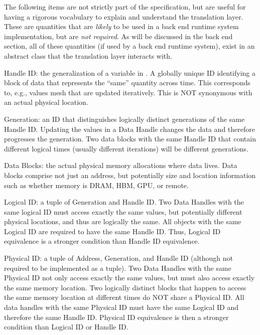The following items are not strictly part of the specification, but are useful
for having a rigorous vocabulary to explain and understand the \gls{translation
layer}.  These are quantities that are \emph{likely} to be used in a \gls{back
end} \gls{runtime system} implementation, but are \emph{not required}.
As will be discussed in the \gls{back end} section, all of these quantities (if
used by a \gls{back end} \gls{runtime system}),
exist in an abstract class  that the \gls{translation
layer} interacts with.
\begin{compactitem}
  \item Handle ID: the generalization of a variable in \CC{}. A globally unique ID identifying a block of data that represents the ``same'' quantity across time.  
This corresponds to, e.g., values mesh that are updated iteratively.  
This is NOT synonymous with an actual physical location.
\item Generation: an ID that distinguishes logically distinct generations of the same Handle ID. 
Updating the values in a Data Handle changes the data and therefore progresses the generation. 
Two data blocks with the same Handle ID that contain different logical times (usually different iterations) will be different generations.
\item Data Blocks: the actual physical memory allocations where data lives. 
Data blocks comprise not just an address, but potentially size and location information such as whether memory is DRAM, HBM, GPU, or remote.
\item Logical ID: a tuple of Generation and Handle ID. 
Two Data Handles with the same logical ID must access exactly the same values, but potentially different physical locations, and thus are logically the same. 
All objects with the same Logical ID are required to have the same Handle ID.
Thus, Logical ID equivalence is a stronger condition than Handle ID equivalence.
\item Physical ID: a tuple of Address, Generation, and Handle ID (although not required to be implemented as a tuple). 
Two Data Handles with the same Physical ID not only access exactly the same values, but must also access exactly the same memory location. 
Two logically distinct blocks that happen to access the same memory location at different times do NOT share a Physical ID. 
All data \glspl{handle} with the same Physical ID must have the same Logical ID and therefore the same Handle ID. 
Physical ID equivalence is then a stronger condition than Logical ID or Handle ID.
\end{compactitem}

